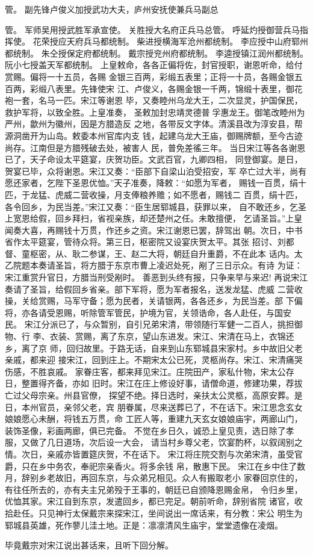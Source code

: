 管。
副先锋卢俊义加授武功大夫，庐州安抚使兼兵马副总

管。
军师吴用授武胜军承宣使。
关胜授大名府正兵马总管。
呼延灼授御营兵马指挥使。
花荣授应天府兵马都统制。
柴进授横海军沧州都统制。
李应授中山府郓州都统制。
朱仝授保定府都统制。
戴宗授兖州府都统制。
李逵授镇江润州都统制。
阮小七授盖天军都统制。
上皇敕命，各各正偏将佐，封官授职，谢恩听命，给付赏赐。偏将一十五员，各赐
金银三百两，彩缎五表里；正将一十员，各赐金银五百两，彩缎八表里。先锋使宋
江、卢俊义，各赐金银一千两，锦缎十表里，御花袍一套，名马一匹。宋江等谢恩
毕，又奏睦州乌龙大王，二次显灵，护国保民，救护军将，以致全胜。上皇准奏，
圣敕加封忠靖灵德普孚惠龙王。御笔改睦州为严州，歙州为徽州，因是方腊造反
之地，各带反文字体。清溪县改为淳安县，帮源洞凿开为山岛。敕委本州官库内支
钱，起建乌龙大王庙，御赐牌额，至今古迹尚存。江南但是方腊残破去处，被害人
民，普免差徭三年。
当日宋江等各各谢恩已了，天子命设太平筵宴，庆贺功臣。文武百官，九卿四相，
同登御宴。是日，贺宴已毕，众将谢恩。宋江又奏：“臣部下自梁山泊受招安，军
卒亡过大半，尚有愿还家者，乞陛下圣恩优恤。”天子准奏，降敕：“如愿为军者，
赐钱一百贯，绢十匹，于龙猛、虎威二营收操，月支俸粮养赡；如不愿者，赐钱二
百贯，绢十匹，各令回乡，为民当差。”宋江又奏：“臣生居郓城县，获罪以来，
自不敢还乡，乞圣上宽恩给假，回乡拜扫，省视亲族，却还楚州之任。未敢擅便，
乞请圣旨。”上皇闻奏大喜，再赐钱十万贯，作还乡之资。宋江谢恩已罢，辞驾出
朝。次日，中书省作太平筵宴，管待众将。第三日，枢密院又设宴庆贺太平。其张
招讨、刘都督、童枢密，从、耿二参谋，王、赵二大将，朝廷自升重爵，不在此本
话内。太乙院题本奏请圣旨，将方腊于东京市曹上凌迟处死，剐了三日示众。有诗
为证：
宋江重赏升官日，方腊当刑受剐时。
善恶到头终有报，只争来早与来迟!
再说宋江奏请了圣旨，给假回乡省亲。部下军将，愿为军者报名，送发龙猛、虎威
二营收操，关给赏赐，马军守备；愿为民者，关请银两，各各还乡，为民当差。部
下偏将，亦各请受恩赐，听除管军管民，护境为官，关领诰命，各人赴任，与国安
民。
宋江分派已了，与众暂别，自引兄弟宋清，带领随行军健一二百人，挑担御物、行
李、衣装、赏赐，离了东京，望山东进发。宋江、宋清在马上，衣锦还乡，离了京
师，回归故里。于路无话，自来到山东郓城县宋家村。乡中故旧父老亲戚，都来迎
接宋江，回到庄上。不期宋太公已死，灵柩尚存。宋江、宋清痛哭伤感，不胜哀戚。
家眷庄客，都来拜见宋江。庄院田产，家私什物，宋太公存日，整置得齐备，亦如
旧时。宋江在庄上修设好事，请僧命道，修建功果，荐拔亡过父母宗亲。州县官僚，
探望不绝。择日选时，亲扶太公灵柩，高原安葬。是日，本州官员，亲邻父老，宾
朋眷属，尽来送葬已了，不在话下。宋江思念玄女娘娘愿心未酬，将钱五万贯，命
工匠人等，重建九天玄女娘娘庙宇，两廊山门，装饰圣像，彩画两廊，俱已完备。
不觉在乡日久，诚恐上皇见责，选日除了孝服，又做了几日道场，次后设一大会，
请当村乡尊父老，饮宴酌杯，以叙阔别之情。次日，亲戚亦皆置筵庆贺，不在话下。
宋江将庄院交割与次弟宋清，虽受官爵，只在乡中务农，奉祀宗亲香火。将多余钱
帛，散惠下民。
宋江在乡中住了数月，辞别乡老故旧，再回东京，与众弟兄相见。众人有搬取老小
家眷回京住的，有往任所去的，亦有夫主兄弟殁于王事的，朝廷已自颁降恩赐金帛，
令归乡里，优恤其家。宋江自到东京，发遣回乡，都已完足。朝前听命，辞别省院
诸官，收拾赴任。只见神行太保戴宗来探宋江，坐间说出一席话来，有分教：宋公
明生为郓城县英雄，死作蓼儿洼土地。正是：凛凛清风生庙宇，堂堂遗像在凌烟。

毕竟戴宗对宋江说出甚话来，且听下回分解。